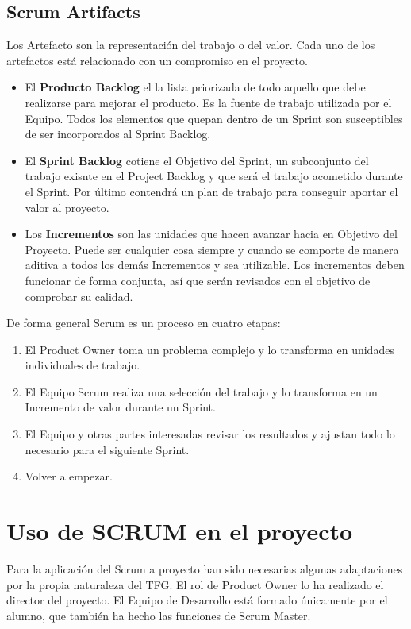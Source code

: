 \subsection{Scrum Artifacts}

Los Artefacto son la representación del trabajo o del valor. Cada uno de los artefactos está relacionado con un compromiso en el proyecto.

\begin{itemize}
    \item El \textbf{Producto Backlog} el la lista priorizada de todo aquello que debe realizarse para mejorar el producto. Es la fuente de trabajo utilizada por el Equipo. Todos los elementos que quepan dentro de un Sprint son susceptibles de ser incorporados al Sprint Backlog.
    \item El \textbf{Sprint Backlog} cotiene el Objetivo del Sprint, un subconjunto del trabajo exisnte en el Project Backlog y que será el trabajo acometido durante el Sprint. Por último contendrá un plan de trabajo para conseguir aportar el valor al proyecto.
    \item Los \textbf{Incrementos} son las unidades que hacen avanzar hacia en Objetivo del Proyecto. Puede ser cualquier cosa siempre y cuando se comporte de manera aditiva a todos los demás Incrementos y sea utilizable. Los incrementos deben funcionar de forma conjunta, así que serán revisados con el objetivo de comprobar su calidad.
\end{itemize}

De forma general Scrum es un proceso en cuatro etapas:

\begin{enumerate}
    \item El Product Owner toma un problema complejo y lo transforma en unidades individuales de trabajo.
    \item El Equipo Scrum realiza una selección del trabajo y lo transforma en un Incremento de valor durante un Sprint.
    \item El Equipo y otras partes interesadas revisar los resultados y ajustan todo lo necesario para el siguiente Sprint.
    \item Volver a empezar.
\end{enumerate}

\section{Uso de SCRUM en el proyecto}

Para la aplicación del Scrum a proyecto han sido necesarias algunas adaptaciones por la propia naturaleza del TFG. El rol de Product Owner lo ha realizado el director del proyecto. El Equipo de Desarrollo está formado únicamente por el alumno, que también ha hecho las funciones de Scrum Master.

